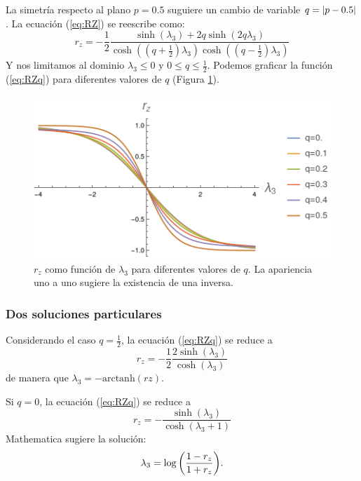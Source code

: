 La simetría respecto al plano $p=0.5$ suguiere un cambio de variable $q=\abs{p-0.5}$. La ecuación (\ref{eq:RZ}) se reescribe como:
\begin{equation}\label{eq:RZq}
r_{z}=-\frac{1}{2}\frac{\sinh(\lambda_{3})+2q\sinh(2q\lambda_{3})}{\cosh((q+\frac{1}{2})\lambda_{3})\cosh((q-\frac{1}{2})\lambda_{3})}
\end{equation}
Y nos limitamos al dominio $\lambda_{3}\leq0$ y $0\leq q\leq\frac{1}{2}$. Podemos graficar la función (\ref{eq:RZq}) para diferentes valores de $q$ (Figura \ref{fig:rzinv}).
\begin{figure}[h!]
\centering
\includegraphics[width=0.6\linewidth]{maxent/figures/rz_has_inverse_lambda-4to4.png}
\caption{$r_{z}$ como función de $\lambda_{3}$ para diferentes valores de $q$. La apariencia uno a uno sugiere la existencia de una inversa.}
\label{fig:rzinv}
\end{figure}

\subsubsection{Dos soluciones particulares}

Considerando el caso $q=\frac{1}{2}$, la ecuación (\ref{eq:RZq}) se reduce a 
\begin{equation}
r_z=-\frac{1}{2}\frac{2\sinh(\lambda_{3})}{\cosh(\lambda_{3})}
\end{equation}
de manera que $\lambda_{3}=-\text{arctanh}(rz)$.

Si $q=0$, la ecuación (\ref{eq:RZq}) se reduce a
\begin{equation}
r_z=-\frac{\sinh(\lambda_{3})}{\cosh(\lambda_{3}+1)}
\end{equation}
Mathematica sugiere la solución:
\begin{equation}\label{eq:lambda0.5}
\lambda_{3}=\log\qty(\frac{1-r_{z}}{1+r_{z}}).
\end{equation}
\newpage